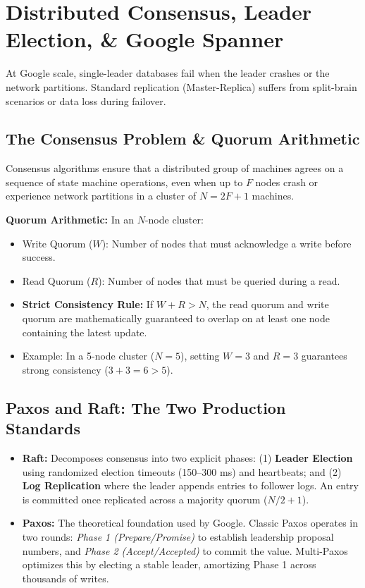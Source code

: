 \documentclass[10pt,journal,compsoc,onecolumn]{IEEEtran}
\begin{document}
\section{Distributed Consensus, Leader Election, \& Google Spanner}
\label{sec:consensus_spanner}

At Google scale, single-leader databases fail when the leader crashes or the network partitions. Standard replication (Master-Replica) suffers from split-brain scenarios or data loss during failover.

\subsection{The Consensus Problem \& Quorum Arithmetic}
Consensus algorithms ensure that a distributed group of machines agrees on a sequence of state machine operations, even when up to $F$ nodes crash or experience network partitions in a cluster of $N = 2F + 1$ machines.

\textbf{Quorum Arithmetic:} In an $N$-node cluster:
\begin{itemize}
    \item Write Quorum ($W$): Number of nodes that must acknowledge a write before success.
    \item Read Quorum ($R$): Number of nodes that must be queried during a read.
    \item \textbf{Strict Consistency Rule:} If $W + R > N$, the read quorum and write quorum are mathematically guaranteed to overlap on at least one node containing the latest update.
    \item Example: In a 5-node cluster ($N=5$), setting $W=3$ and $R=3$ guarantees strong consistency ($3 + 3 = 6 > 5$).
\end{itemize}

\subsection{Paxos and Raft: The Two Production Standards}
\begin{itemize}
    \item \textbf{Raft:} Decomposes consensus into two explicit phases: (1) \textbf{Leader Election} using randomized election timeouts (150--300 ms) and heartbeats; and (2) \textbf{Log Replication} where the leader appends entries to follower logs. An entry is committed once replicated across a majority quorum ($N/2 + 1$).
    \item \textbf{Paxos:} The theoretical foundation used by Google. Classic Paxos operates in two rounds: \emph{Phase 1 (Prepare/Promise)} to establish leadership proposal numbers, and \emph{Phase 2 (Accept/Accepted)} to commit the value. Multi-Paxos optimizes this by electing a stable leader, amortizing Phase 1 across thousands of writes.
\end{itemize}
\end{document}

